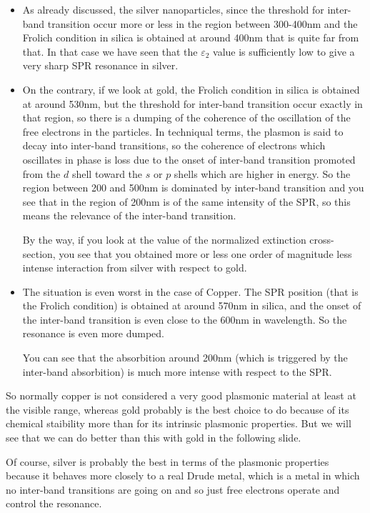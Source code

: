 \documentclass[../main/main.tex]{subfiles}
\begin{document}
\begin{itemize}
\item As already discussed, the silver nanoparticles, since the threshold for inter-band transition occur more or less in the region between 300-400nm and the Frolich condition in silica is obtained at around 400nm that is quite far from that. In that case we have seen that the \( \varepsilon _2 \) value is sufficiently low to give a very sharp SPR resonance in silver.

\item On the contrary, if we look at gold, the Frolich condition in silica is obtained at around 530nm, but the threshold for inter-band transition occur exactly in that region, so there is a dumping of the coherence of the oscillation of the free electrons in the particles. In techniqual terms, the plasmon is said to decay into inter-band transitions, so the coherence of electrons which oscillates in phase is loss due to the onset of inter-band transition promoted from the \( d \) shell toward the \( s \) or \( p \) shells which are higher in energy.
So the region between 200 and 500nm is dominated by inter-band transition and you see that in the region of 200nm is of the same intensity of the SPR, so this means the relevance of the inter-band transition.

By the way, if you look at the value of the normalized extinction cross-section, you see that you obtained more or less one order of magnitude less intense interaction from silver with respect to gold.

\item The situation is even worst in the case of Copper. The SPR position (that is the Frolich condition) is obtained at around 570nm in silica, and the onset of the inter-band transition is even close to the 600nm in wavelength. So the resonance is even more dumped.

You can see that the absorbition around 200nm (which is triggered by the inter-band absorbition) is much more intense with respect to the SPR.

\end{itemize}
So normally copper is not considered a very good plasmonic material at least at the visible range, whereas gold probably is the best choice to do because of its chemical staibility more than for its intrinsic plasmonic properties.
But we will see that we can do better than this with gold in the following slide.

Of course, silver is probably the best in terms of the plasmonic properties because it behaves more closely to a real Drude metal, which is a metal in which no inter-band transitions are going on and so just free electrons operate and control the resonance.
\end{document}
